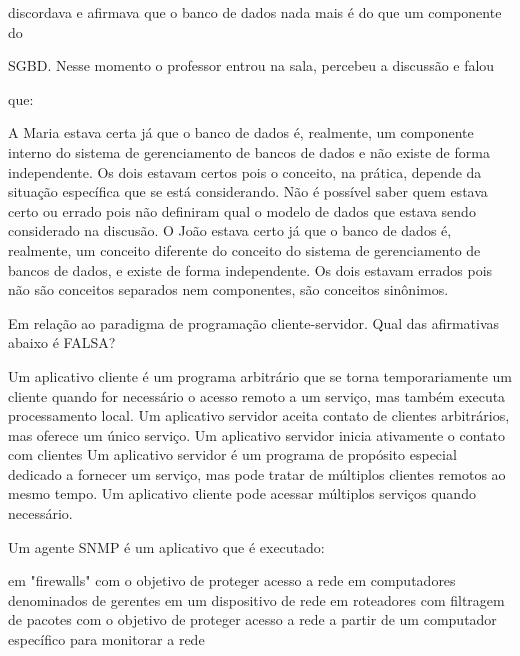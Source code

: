 \documentclass[12pt, addpoints]{exam}
\begin{document}
\begin{questions}
discordava e afirmava que o banco de dados nada mais é do que um componente do

SGBD. Nesse momento o professor entrou na sala, percebeu a discussão e falou

que:
\begin{choices}
\choice A Maria estava certa já que o banco de dados é, realmente, um componente interno do sistema de gerenciamento de bancos de dados e não existe de forma independente.
\choice Os dois estavam certos pois o conceito, na prática, depende da situação específica que se está considerando.
\choice Não é possível saber quem estava certo ou errado pois não definiram qual o modelo de dados que estava sendo considerado na discusão.
\choice O João estava certo já que o banco de dados é, realmente, um conceito diferente do conceito do sistema de gerenciamento de bancos de dados, e existe de forma independente.
\choice Os dois estavam errados pois não são conceitos separados nem componentes, são conceitos sinônimos.
\end{choices}

\question

Em relação ao paradigma de programação cliente-servidor. Qual das afirmativas abaixo é FALSA?
\begin{choices}
\choice Um aplicativo cliente é um programa arbitrário que se torna temporariamente um cliente quando for necessário o acesso remoto a um serviço, mas também executa processamento local.
\choice Um aplicativo servidor aceita contato de clientes arbitrários, mas oferece um único serviço. 
\choice Um aplicativo servidor inicia ativamente o contato com clientes 
\choice Um aplicativo servidor é um programa de propósito especial dedicado a fornecer um serviço, mas pode tratar de múltiplos clientes remotos ao mesmo tempo. 
\choice Um aplicativo cliente pode acessar múltiplos serviços quando necessário.
\end{choices}

\question

Um agente SNMP é um aplicativo que é executado:
\begin{choices}
\choice em "firewalls" com o objetivo de proteger acesso a rede
\choice em computadores denominados de gerentes
\choice em um dispositivo de rede
\choice em roteadores com filtragem de pacotes com o objetivo de proteger acesso a rede
\choice a partir de um computador específico para monitorar a rede
\end{choices}

\question


\end{questions}
\end{document}

